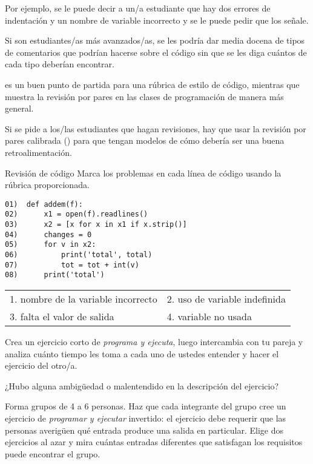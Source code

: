 Por ejemplo, 
se le puede decir a un/a estudiante que hay dos errores de indentación y un nombre de variable incorrecto y se le puede pedir que los señale.

Si son estudiantes/as más avanzados/as, se les podría dar media docena de tipos de comentarios que podrían hacerse sobre el código sin que se les diga cuántos de cada tipo deberían encontrar.

\cite{Steg2016b} es un buen punto de partida para una rúbrica de estilo de código, mientras que~\cite{Luxt2009} muestra la revisión por pares en las clases de programación de manera más general.

Si se pide a los/las estudiantes que hagan revisiones, hay que usar la revisión por pares calibrada () para que tengan modelos de cómo debería ser una buena retroalimentación.

\begin{aside}{Revisión de código}
 Marca los problemas en cada línea de código usando la rúbrica proporcionada.

\begin{verbatim}
01)  def addem(f):
02)      x1 = open(f).readlines()
03)      x2 = [x for x in x1 if x.strip()]
04)      changes = 0
05)      for v in x2:
06)          print('total', total)
07)          tot = tot + int(v)
08)      print('total')
\end{verbatim}

   \begin{longtable}{ll}
    1. nombre de la variable incorrecto   & 2. uso de variable indefinida \\
    3. falta el valor de salida & 4. variable no usada
  \end{longtable}

\end{aside}



Crea un ejercicio corto de \emph{programa y ejecuta}, 
luego intercambia con tu pareja 
y analiza cuánto tiempo les toma a cada uno de ustedes entender y hacer el ejercicio del otro/a.

¿Hubo alguna ambigüedad o malentendido en la descripción del ejercicio?


Forma grupos de 4 a 6 personas.
Haz que cada integrante del grupo cree un ejercicio de \emph{programar y ejecutar} invertido: el ejercicio debe requerir que las personas averigüen qué entrada produce una salida en particular.
Elige dos ejercicios al azar 
y mira cuántas entradas diferentes que satisfagan los requisitos puede encontrar el grupo.

